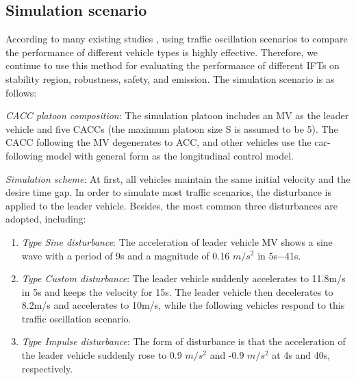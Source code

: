 \documentclass[journal]{IEEEtran}
\begin{document}
\subsection{Simulation scenario}
\label{Section 5.1}
According to many existing studies \citep{gong2016constrained,li2014stop}, using traffic oscillation scenarios to compare the performance of different vehicle types is highly effective. Therefore, we continue to use this method for evaluating the performance of different IFTs on stability region, robustness, safety, and emission. The simulation scenario is as follows:

\textit{CACC platoon composition}: The simulation platoon includes an MV as the leader vehicle and five CACCs (the maximum platoon size S is assumed to be 5). The CACC following the MV degenerates to ACC, and other vehicles use the car-following model with general form as the longitudinal control model.

\textit{Simulation scheme}: At first, all vehicles maintain the same initial velocity and the desire time gap. In order to simulate most traffic scenarios, the disturbance is applied to the leader vehicle. Besides, the most common three disturbances are adopted, including:

\begin{enumerate}
  \item \textit{Type \uppercase\expandafter{} Sine disturbance}: The acceleration of leader vehicle MV shows a sine wave with a period of 9s and a magnitude of 0.16 $m/s^2$ in 5s$-$41s.
  \item \textit{Type \uppercase\expandafter{} Custom disturbance}: The leader vehicle suddenly accelerates to 11.8m/s in 5s and keeps the velocity for 15s. The leader vehicle then decelerates to 8.2m/s and accelerates to 10m/s, while the following vehicles respond to this traffic oscillation scenario.
  \item \textit{Type \uppercase\expandafter{} Impulse disturbance}: The form of disturbance is that the acceleration of the leader vehicle suddenly rose to 0.9 $m/s^2$ and -0.9 $m/s^2$ at 4s and 40s, respectively.
\end{enumerate}
\end{document}
